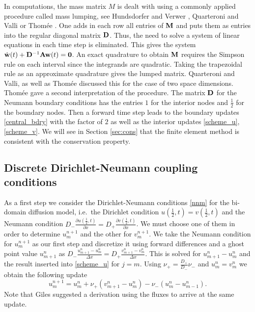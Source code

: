In computations, the mass matrix $M$ is dealt with using a commonly applied procedure called mass lumping, 
see Hundsdorfer and Verwer \cite[Section III.5]{bHUVE}, Quarteroni and Valli \cite[Section 11.4]{bQUVA1}
or Thom\'ee \cite[Chapter 15]{bTHOME}. 
One adds in each row all entries of ${\mathbf M}$ and puts them as entries into the regular diagonal
matrix ${\mathbf D}$. Thus, the need to solve a system of linear equations in each time step is eliminated. 
This gives the system $\dot{{\mathbf w}}(t) +{\mathbf D}^{-1}{\mathbf A}{\mathbf w}(t)={\mathbf 0}$. An exact quadrature to obtain ${\mathbf M}$
requires the Simpson rule on each interval since the integrands are quadratic. Taking the trapezoidal rule as an
approximate quadrature gives the lumped matrix. Quarteroni and Valli, as well as Thom\'ee
discussed this for the case of two space dimensions. Thom\'ee gave a second
interpretation of the procedure.
The matrix ${\mathbf D}$ for the Neumann boundary conditions has the entries $1$ for the interior nodes and $\frac 12$ for the boundary
nodes. Then a forward time step leads to the boundary updates \eqref{central_bdry} with the factor of $2$ 
as well as the interior updates \eqref{scheme_u}, \eqref{scheme_v}.
We will see in Section \ref{sec:cons} that the finite element method 
is consistent with the conservation property.

%
%
\subsection{Discrete Dirichlet-Neumann coupling conditions}
%
%

As a first step we consider the Dirichlet-Neumann conditions \eqref{nnm} for the bi-domain diffusion model, i.e.\ the Dirichlet condition
$u(\frac 12,t)=v(\frac 12,t)$ and the Neumann condition 
$D_{-}\frac{\partial  u(\frac 12,t)}{\partial x} =D_{+}\frac{\partial  v(\frac 12,t)}{\partial x}$.
We must choose one of them in order to determine $u_m^{n+1}$ and the other for $v_m^{n+1}$.
We take the Neumann condition for $u_m^{n+1}$ as our first step and discretize it using forward differences and a ghost point value $u_{m+1}^n$ as
$D_{-}\frac{u_{m+1}^n-u_{m}^n}{\Delta x}=D_{+}\frac{v^n_{m+1}-v^n_{m}}{\Delta x}$. 
This is solved for $u_{m+1}^n-u_{m}^n$ and the result inserted into \eqref{scheme_u} for $j=m$. Using $\nu_+=\frac{D_{+}}{D_{-}}\nu_-$
and $u_m^n=v_m^n$ we obtain the following update
% 
\begin{equation}
u^{n+1}_{m}= u^n_{m}+ \nu_{+} (v_{m+1}^n-u_{m}^n)-\nu_{-}(u_{m}^n-u_{m-1}^n).
 \label{f16}
\end{equation}
%
Note that Giles \cite{GIL} suggested a derivation using the fluxes to arrive at the same update.

